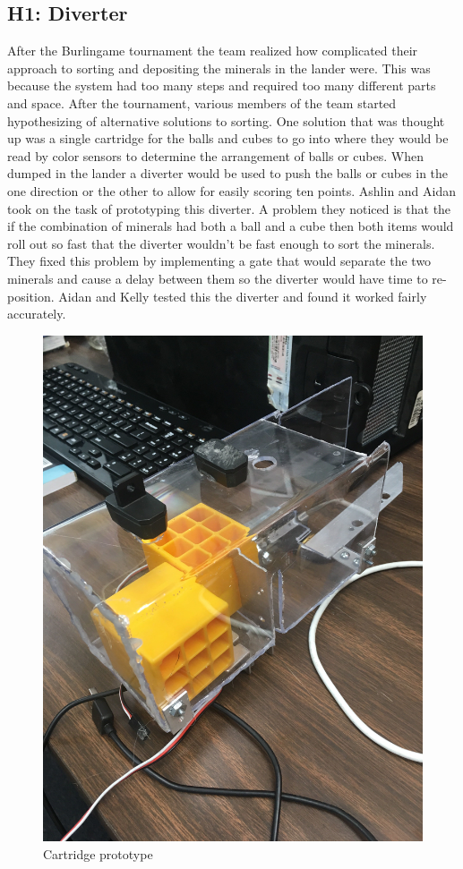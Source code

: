 \documentclass{article}
\begin{document}
\subsection{H1: Diverter}

After the Burlingame tournament the team realized how complicated their approach to sorting and depositing the minerals in the lander were. This was because the system had too many steps and required too many different parts and space. After the tournament, various members of the team started hypothesizing of alternative solutions to sorting. One solution that was thought up was a single cartridge for the balls and cubes to go into where they would be read by color sensors to determine the arrangement of balls or cubes. When dumped in the lander a diverter would be used to push the balls or cubes in the one direction or the other to allow for easily scoring ten points. Ashlin and Aidan took on the task of prototyping this diverter. A problem they noticed is that the if the combination of minerals had both a ball and a cube then both items would roll out so fast that the diverter wouldn't be fast enough to sort the minerals. They fixed this problem by implementing a gate that would separate the two minerals and cause a delay between them so the diverter would have time to re-position. Aidan and Kelly tested this the diverter and found it worked fairly accurately.

\begin{figure}
    \centering
    \includegraphics[width=.6 \textwidth]{14_12-03/images/cartridge1.JPG}
    \caption{Cartridge prototype}
    \label{fig:cartridge}
\end{figure}
\end{document}
